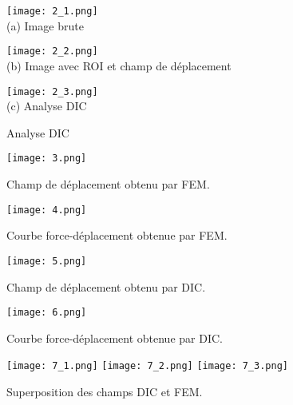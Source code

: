 \documentclass[12pt,a4paper]{article}
\begin{document}
\begin{figure}[h]
    \centering
    \parbox{0.3\textwidth}{
        \centering
        \texttt{[image: 2\_1.png]} \\
        (a) Image brute
    }
    \hfill
    \parbox{0.3\textwidth}{
        \centering
        \texttt{[image: 2\_2.png]} \\
        (b) Image avec ROI et champ de déplacement
    }
    \hfill
    \parbox{0.33\textwidth}{
        \centering
        \texttt{[image: 2\_3.png]} \\
        (c) Analyse DIC
    }
    \caption{Analyse DIC}
    \label{fig:dic_images}
\end{figure}

\begin{figure}[h]
    \centering
    \texttt{[image: 3.png]}
    \caption{Champ de déplacement obtenu par FEM.}
    \label{fig:deplacement_fem}
\end{figure}

\begin{figure}[h]
    \centering
    \texttt{[image: 4.png]}
    \caption{Courbe force-déplacement obtenue par FEM.}
    \label{fig:force_dep_fem}
\end{figure}

\begin{figure}[h]
    \centering
    \texttt{[image: 5.png]}
    \caption{Champ de déplacement obtenu par DIC.}
    \label{fig:deplacement_dic}
\end{figure}

\begin{figure}[h]
    \centering
    \texttt{[image: 6.png]}
    \caption{Courbe force-déplacement obtenue par DIC.}
    \label{fig:force_dep_dic}
\end{figure}

\begin{figure}[h]
    \centering
    \texttt{[image: 7\_1.png]}
    \texttt{[image: 7\_2.png]}
    \texttt{[image: 7\_3.png]}
    \caption{Superposition des champs DIC et FEM.}
    \label{fig:superposition_champs}
\end{figure}
\end{document}

